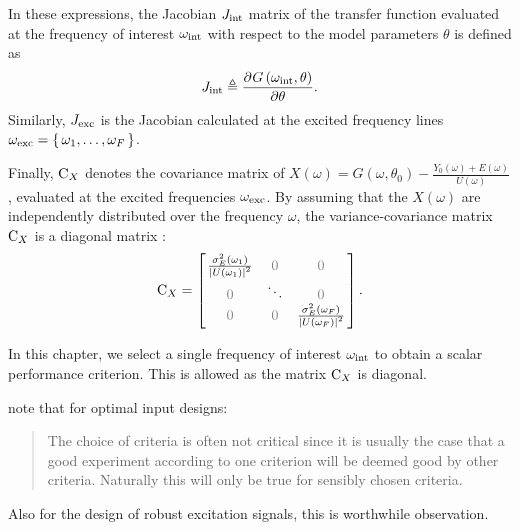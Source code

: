   In these expressions, the Jacobian $J_{\mathrm{int}}$ matrix of the transfer function evaluated at the frequency of interest $\omega_{\mathrm{int}}$ with respect to the model parameters $\theta$ is defined as
  \begin{equation}
    J_{\mathrm{int}} \triangleq
         \frac{{\partial}^{} G\left( \omega_{\mathrm{int}}, \theta \right) }{\partial \theta}
    \text{.}
  \end{equation}
  Similarly, $J_{\mathrm{exc}}$ is the Jacobian calculated at the excited frequency lines $\omega_{\mathrm{exc}} = \set{\omega_1, \ldots, \omega_F}$.

  Finally, $\mathrm{C}_{X}$ denotes the covariance matrix of $X\left(\omega\right) = G\left(\omega, \theta_0 \right) - \frac{Y_0\left(\omega \right) + E\left( \omega \right)  }{ U\left( \omega \right) } $, evaluated at the excited frequencies $\omega_{\mathrm{exc}}$.
  By assuming that the $X\left( \omega \right) $ are independently distributed over the frequency $\omega$, the variance-covariance matrix $\mathrm{C}_{X}$ is a diagonal matrix \citep{Pintelon2012}:
  \begin{equation}
    \C_{X} =
               \left[ \left.
               \begin{matrix}
                 \frac{\sigma^2_E\left(\omega_1 \right) }
                      {\abs{ U\left(\omega_1 \right)}^2 } & \deemph{0} & \deemph{0}\\
                 \deemph{0} & \ddots & \deemph{0} \\
                 \deemph{0} & \deemph{0} & \frac{\sigma^2_E\left(\omega_F \right) }
                              {\abs{U\left(\omega_F \right)}^2 }
               \end{matrix}
               \right.^{\vphantom{x}}\right]
    \text{.}
  \end{equation}

  In this chapter, we select a single frequency of interest $\omega_{\mathrm{int}}$ to obtain a scalar performance criterion.
  This is allowed as the matrix $\mathrm{C}_{X}$ is diagonal.

\begin{remark}
\citet{Goodwin1977} note that for optimal input designs:
\begin{quote}
The choice of criteria is often not critical since it is usually the case that a good experiment according to one criterion will be deemed good by other criteria. 
Naturally this will only be true for sensibly chosen criteria.
\end{quote}
Also for the design of robust excitation signals, this is worthwhile observation.
\end{remark}

